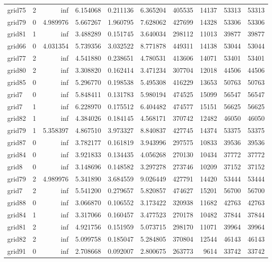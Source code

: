 \begin{longtable}{|l|r|r|r|r|r|r|r|r|r|}
grid75 & 2 & inf & 6.154068 & 0.211136 & 6.365204 & 405535 & 14137 & 53313 & 53313 \\
grid79 & 0 & 4.989976 & 5.667267 & 1.960795 & 7.628062 & 427699 & 14328 & 53306 & 53306 \\
grid81 & 1 & inf & 3.488289 & 0.151745 & 3.640034 & 298112 & 11013 & 39877 & 39877 \\
grid66 & 0 & 4.031354 & 5.739356 & 3.032522 & 8.771878 & 449311 & 14138 & 53044 & 53044 \\
grid77 & 2 & inf & 4.541880 & 0.238651 & 4.780531 & 413606 & 14071 & 53401 & 53401 \\
grid80 & 2 & inf & 3.308820 & 0.162414 & 3.471234 & 307704 & 12018 & 44506 & 44506 \\
grid85 & 0 & inf & 5.296770 & 0.198538 & 5.495308 & 416229 & 13653 & 50763 & 50763 \\
grid7 & 0 & inf & 5.848411 & 0.131783 & 5.980194 & 474525 & 15099 & 56547 & 56547 \\
grid7 & 1 & inf & 6.228970 & 0.175512 & 6.404482 & 474577 & 15151 & 56625 & 56625 \\
grid82 & 1 & inf & 4.384026 & 0.184145 & 4.568171 & 370742 & 12482 & 46050 & 46050 \\
grid79 & 1 & 5.358397 & 4.867510 & 3.973327 & 8.840837 & 427745 & 14374 & 53375 & 53375 \\
grid87 & 0 & inf & 3.782177 & 0.161819 & 3.943996 & 297575 & 10833 & 39536 & 39536 \\
grid84 & 0 & inf & 3.921833 & 0.134435 & 4.056268 & 270130 & 10434 & 37772 & 37772 \\
grid8 & 0 & inf & 3.148696 & 0.148582 & 3.297278 & 273746 & 10209 & 37152 & 37152 \\
grid79 & 2 & 4.989976 & 5.341890 & 3.684559 & 9.026449 & 427791 & 14420 & 53444 & 53444 \\
grid7 & 2 & inf & 5.541200 & 0.279657 & 5.820857 & 474627 & 15201 & 56700 & 56700 \\
grid88 & 0 & inf & 3.066870 & 0.106552 & 3.173422 & 320938 & 11682 & 42763 & 42763 \\
grid84 & 1 & inf & 3.317066 & 0.160457 & 3.477523 & 270178 & 10482 & 37844 & 37844 \\
grid81 & 2 & inf & 4.921756 & 0.151959 & 5.073715 & 298170 & 11071 & 39964 & 39964 \\
grid82 & 2 & inf & 5.099758 & 0.185047 & 5.284805 & 370804 & 12544 & 46143 & 46143 \\
grid91 & 0 & inf & 2.708668 & 0.092007 & 2.800675 & 263773 & 9614 & 33742 & 33742 \\

\end{longtable}

